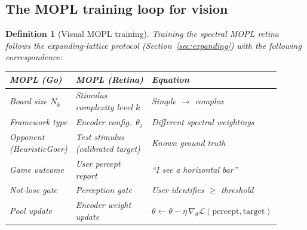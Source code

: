 \documentclass[11pt,a4paper]{article}
\newtheorem{definition}[theorem]{Definition}
\newcommand{\cL}{\mathcal{L}}
\begin{document}
\subsection{The MOPL training loop for vision}
\label{app:retina-training}

\begin{definition}[Visual MOPL training]\label{def:visual-mopl}
Training the spectral MOPL retina follows the expanding-lattice
protocol (Section~\ref{sec:expanding}) with the following
correspondence:
\begin{center}
\small
\begin{tabular}{@{}p{0.22\linewidth}p{0.33\linewidth}p{0.35\linewidth}@{}}
\toprule
\textbf{MOPL (Go)} & \textbf{MOPL (Retina)} & \textbf{Equation} \\
\midrule
Board size $N_k$ & Stimulus complexity level $k$ &
  Simple $\to$ complex \\
Framework type & Encoder config.\ $\theta_j$ &
  Different spectral weightings \\
Opponent (Heuristic\-Goer) & Test stimulus
  (calibrated target) & Known ground truth \\
Game outcome & User percept report &
  ``I see a horizontal bar'' \\
Not-lose gate & Perception gate &
  User identifies $\geq$ threshold \\
Pool update & Encoder weight update &
  $\theta \gets \theta - \eta\,\nabla_\theta
  \cL(\text{percept}, \text{target})$ \\
\bottomrule
\end{tabular}
\end{center}
\end{definition}
\end{document}
